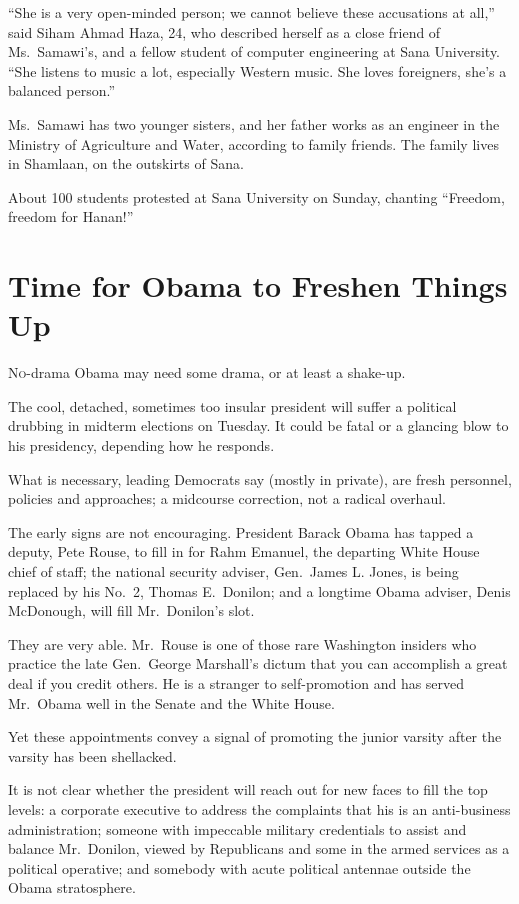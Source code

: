 ﻿\documentclass[12pt]{article}
\begin{document}
``She is a very open-minded person; we cannot believe these accusations at all,'' said Siham Ahmad
Haza, 24, who described herself as a close friend of Ms.~Samawi's, and a fellow student of computer
engineering at Sana University. ``She listens to music a lot, especially Western music. She loves
foreigners, she's a balanced person.''

Ms.~Samawi has two younger sisters, and her father works as an engineer in the Ministry of
Agriculture and Water, according to family friends. The family lives in Shamlaan, on the outskirts
of Sana.

About 100 students protested at Sana University on Sunday, chanting ``Freedom, freedom for Hanan!''

\section{Time for Obama to Freshen Things Up}

\lettrine{N}{o}-drama Obama may need some drama, or at least a shake-up.

The cool, detached, sometimes too insular president will suffer a political drubbing in midterm
elections on Tuesday. It could be fatal or a glancing blow to his presidency, depending how he
responds.

What is necessary, leading Democrats say (mostly in private), are fresh personnel, policies and
approaches; a midcourse correction, not a radical overhaul.

The early signs are not encouraging. President Barack Obama has tapped a deputy, Pete Rouse, to fill
in for Rahm Emanuel, the departing White House chief of staff; the national security adviser,
Gen.~James L. Jones, is being replaced by his No.~2, Thomas E.~Donilon; and a longtime Obama
adviser, Denis McDonough, will fill Mr.~Donilon's slot.

They are very able. Mr.~Rouse is one of those rare Washington insiders who practice the late
Gen.~George Marshall's dictum that you can accomplish a great deal if you credit others. He is a
stranger to self-promotion and has served Mr.~Obama well in the Senate and the White House.

Yet these appointments convey a signal of promoting the junior varsity after the varsity has been
shellacked.

It is not clear whether the president will reach out for new faces to fill the top levels: a
corporate executive to address the complaints that his is an anti-business administration; someone
with impeccable military credentials to assist and balance Mr.~Donilon, viewed by Republicans and
some in the armed services as a political operative; and somebody with acute political antennae
outside the Obama stratosphere.
\end{document}
